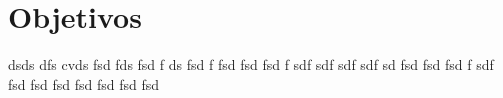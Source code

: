 \section{Objetivos}
dsds dfs cvds fsd fds fsd f ds fsd f fsd fsd fsd f sdf sdf sdf sdf sd fsd fsd
fsd f sdf fsd fsd fsd fsd fsd fsd fsd